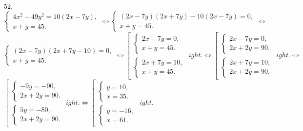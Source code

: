 52. $\begin{cases} 4x^2-49y^2=10(2x-7y),\\ x+y=45.\end{cases}\Leftrightarrow
\begin{cases} (2x-7y)(2x+7y)-10(2x-7y)=0,\\ x+y=45.\end{cases}\Leftrightarrow$\\$
\begin{cases} (2x-7y)(2x+7y-10)=0,\\ x+y=45.\end{cases}\Leftrightarrow
\left[\begin{array}{l}\begin{cases} 2x-7y=0,\\ x+y=45.\end{cases}\\
\begin{cases} 2x+7y=10,\\ x+y=45.\end{cases}\end{array}
ight.\Leftrightarrow
\left[\begin{array}{l}\begin{cases} 2x-7y=0,\\ 2x+2y=90.\end{cases}\\
\begin{cases} 2x+7y=10,\\ 2x+2y=90.\end{cases}\end{array}
ight.\Leftrightarrow$\\$
\left[\begin{array}{l}\begin{cases} -9y=-90,\\ 2x+2y=90.\end{cases}\\
\begin{cases} 5y=-80,\\ 2x+2y=90.\end{cases}\end{array}
ight.
\Leftrightarrow
\left[\begin{array}{l}\begin{cases} y=10,\\ x=35.\end{cases}\\
\begin{cases} y=-16,\\ x=61.\end{cases}\end{array}
ight.$\\
